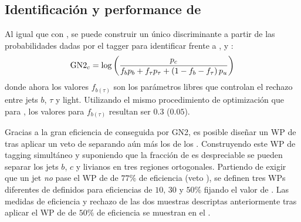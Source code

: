 \subsection{Identificación y performance de \ctagging}

Al igual que con \btagging, se puede construir un único discriminante a partir de las probabilidades dadas por el tagger para identificar \cjets frente a \bjets, \tjets y \ljets:
\begin{equation}
    \text{GN2}_{c} = \log \left(
        \frac{p_c}{f_b p_b + f_{\tau} p_{\tau} + \left(1-f_b-f_{\tau}\right)p_u}
    \right)
\end{equation}
donde ahora los valores \(f_{b(\tau)}\) son los parámetros libres que controlan el rechazo entre jets \(b\), \(\tau\) y light. Utilizando el mismo procedimiento de optimización que para \btagging, los valores para \(f_{b(\tau)}\) resultan ser \(0.3\) (\(0.05\)).

Gracias a la gran eficiencia de \btagging conseguida por GN2, es posible diseñar un \ac{WP} de \ctagging tras aplicar un veto de \btagging separando aún más los \cjets de los \ljets. Construyendo este \ac{WP} de tagging simultáneo y suponiendo que la fracción de \tjets es despreciable se pueden separar los jets \(b\), \(c\) y livianos en tres regiones ortogonales. Partiendo de exigir que un jet \textit{no} pase el \ac{WP} de \btagging de \(77\%\) de eficiencia (veto \btag), se definen tres \acp{WP} diferentes de \ctagging definidos para eficiencias de \(10, \, 30\) y \(50\%\) fijando el valor de \gntc. Las medidas de eficiencia y rechazo de las dos muestras descriptas anteriormente tras aplicar el \ac{WP} de \ctag de \(50\%\) de eficiencia se muestran en el \Tab{\ref{tab:objects:ftag:ctag_efficiency_original}}.

\begin{table}[ht!]
    \caption{Medidas de eficiencia de \ctagging para \cjets, y valores de rechazos de \bjets, \ljets y \tjets en los regímenes de bajo y alto \pt. Los valores corresponden a aquellos luego de aplicar el veto del \ac{WP} de \btagging de \(77\%\) y de \(50\%\) de \ctagging}
    \label{tab:objects:ftag:ctag_efficiency_original}
\end{table}